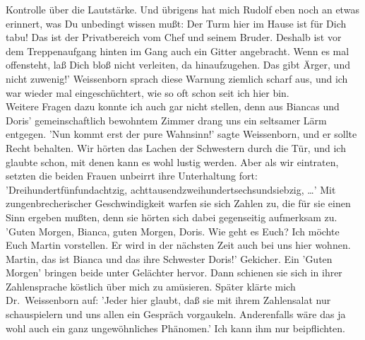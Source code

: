 Kontrolle \"uber die Lautst\"arke. Und \"ubrigens hat mich Rudolf eben noch
an etwas erinnert, was Du unbedingt wissen mu{\ss}t: Der Turm hier im Hause
ist f\"ur Dich tabu! Das ist der Privatbereich vom Chef und seinem Bruder.
Deshalb ist vor dem Treppenaufgang hinten im Gang auch ein Gitter angebracht.
Wenn es mal offensteht, la{\ss} Dich blo{\ss} nicht verleiten, da hinaufzugehen.
Das gibt \"Arger, und nicht zuwenig!' Weissenborn sprach diese Warnung ziemlich
scharf aus, und ich war wieder mal eingesch\"uchtert, wie so oft schon seit ich
hier bin. \\
Weitere Fragen dazu konnte ich auch gar nicht stellen, denn aus Biancas und
Doris' gemeinschaftlich bewohntem Zimmer drang uns ein seltsamer L\"arm
entgegen. 'Nun kommt erst der pure Wahnsinn!' sagte Weissenborn, und er
sollte Recht behalten. Wir h\"orten das Lachen der Schwestern durch die T\"ur,
und ich glaubte schon, mit denen kann es wohl lustig werden. Aber als wir
eintraten, setzten die beiden Frauen unbeirrt ihre Unterhaltung fort:
'Dreihundertf\"unfundachtzig, achttausendzweihundertsechsundsiebzig, \dots '
Mit zungenbrecherischer Geschwindigkeit warfen sie sich Zahlen zu, die f\"ur
sie einen Sinn ergeben mu{\ss}ten, denn sie h\"orten sich dabei gegenseitig
aufmerksam zu. 'Guten Morgen, Bianca, guten Morgen, Doris. Wie geht es Euch?
Ich m\"ochte Euch Martin vorstellen. Er wird in der n\"achsten Zeit auch bei
uns hier wohnen. Martin, das ist Bianca und das ihre Schwester Doris!'
Gekicher. Ein 'Guten Morgen' bringen beide unter Gel\"achter hervor. Dann
schienen sie sich in ihrer Zahlensprache k\"ostlich \"uber mich zu
am\"usieren. Sp\"ater kl\"arte mich Dr.~Weissenborn auf: 'Jeder hier glaubt,
da{\ss} sie mit ihrem Zahlensalat nur schauspielern und uns allen ein
Gespr\"ach vorgaukeln. Anderenfalls w\"are 
\newpage \noindent %
das ja wohl auch ein ganz ungew\"ohnliches Ph\"anomen.' Ich kann ihm nur 
beipflichten. 